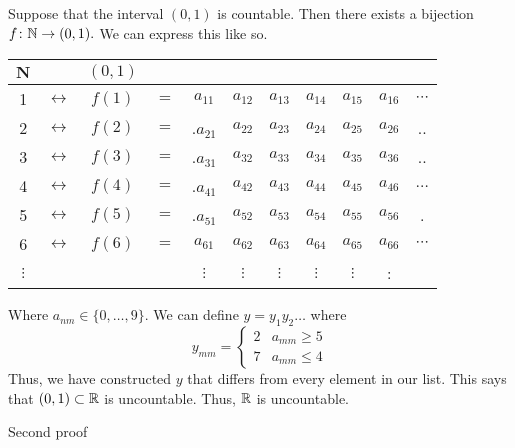 \documentclass{report}
\begin{document}
\begin{myproof}

  Suppose that the interval $(0,1)$ is countable. Then there exists a bijection $f \colon \NN \rightarrow (0,1).$ We can express this like so.

  \bigskip

 \begin{centering}
     
\begin{tabular}{c c c c c c c c c c c}
 $\mathbf{N}$ & & $(0,1)$ & & & & & & & & \\
\hline 1 & $\longleftrightarrow$ & $f(1)$ & $=$ & $a_{11}$ & $a_{12}$ & $a_{13}$ & $a_{14}$ & $a_{15}$ & $a_{16}$ & $\cdots$ \\
 2 & $\longleftrightarrow$ & $f(2)$ & $=$ &.$a_{21}$ & $a_{22}$ & $a_{23}$ & $a_{24}$ & $a_{25}$ & $a_{26}$ & .. \\
 3 & $\longleftrightarrow$ & $f(3)$ & $=$ &.$a_{31}$ & $a_{32}$ & $a_{33}$ & $a_{34}$ & $a_{35}$ & $a_{36}$ & .. \\
 4 & $\longleftrightarrow$ & $f(4)$ & $=$ &.$a_{41}$ & $a_{42}$ & $a_{43}$ & $a_{44}$ & $a_{45}$ & $a_{46}$ & $\ldots$ \\
 5 & $\longleftrightarrow$ & $f(5)$ & $=$ &.$a_{51}$ & $a_{52}$ & $a_{53}$ & $a_{54}$ & $a_{55}$ & $a_{56}$ & . \\
 6 & $\longleftrightarrow$ & $f(6)$ & $=$ & $a_{61}$ & $a_{62}$ & $a_{63}$ & $a_{64}$ & $a_{65}$ & $a_{66}$ & $\cdots$ \\
$\vdots$ & & & & $\vdots$ & $\vdots$ & $\vdots$ & $\vdots$ & $\vdots$ & : & \\

\end{tabular}
\end{centering}   

Where $a_{nm} \in \{0,\dots,9\}.$ We can define $y=y_1y_2\dots$ where
$$ y_{mm} = 
  \begin{cases} 
    2  &  a_{mm} \geq 5 \\
    7 &   a_{mm} \leq 4
   \end{cases}
$$
Thus, we have constructed $y$ that differs from every element in our list. This says that $(0,1) \subset \RR$ is uncountable. Thus, $\RR$ is uncountable.

\end{myproof}

Second proof
\end{document}
